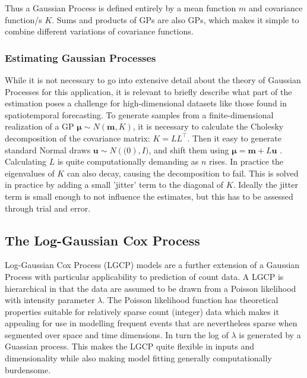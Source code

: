 Thus a Gaussian Process is defined entirely by a mean function $m$ and covariance function/s $K$. Sums and products of GPs are also GPs, which makes it simple to combine different variations of covariance functions.

\subsubsection{Estimating Gaussian Processes}

While it is not necessary to go into extensive detail about the theory of Gaussian Processes for this application, it is relevant to briefly describe what part of the estimation poses a challenge for high-dimensional datasets like those found in spatiotemporal forecasting. To generate samples from a finite-dimensional realization of a GP $\mathbf{\mu} \sim N(\mathbf{m},K)$, it is necessary to calculate the Cholesky decomposition of the covariance matrix: $K=LL^\intercal$. Then it easy to generate standard Normal draws $\mathbf{u} \sim N(\mathbf(0),I)$, and shift them using $\mathbf{\mu}=\mathbf{m}+L\mathbf{u}$ \cite{rasmussen_2005}. Calculating $L$ is quite computationally demanding as $n$ rises. In practice the eigenvalues of $K$ can also decay, causing the decomposition to fail. This is solved in practice by adding a small 'jitter' term to the diagonal of $K$. Ideally the jitter term is small enough to not influence the estimates, but this has to be assessed through trial and error. \par


\subsection{The Log-Gaussian Cox Process}

Log-Gaussian Cox Process (LGCP) models are a further extension of a Gaussian Process with particular applicability to prediction of count data. A LGCP is hierarchical in that the data are assumed to be drawn from a Poisson likelihood with intensity parameter $\lambda$. The Poisson likelihood function has theoretical properties suitable for relatively sparse count (integer) data which makes it appealing for use in modelling frequent events that are nevertheless sparse when segmented over space and time dimensions. In turn the log of $\lambda$  is generated by a Guassian process\cite{teng_2017}. This makes the LGCP quite flexible in inputs and dimensionality while also making model fitting generally computationally burdensome. \par

